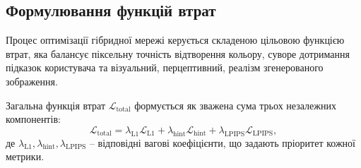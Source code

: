         \subsection{Формулювання функцій втрат}
            Процес оптимізації гібридної мережі керується складеною цільовою функцією втрат,
            яка балансує піксельну точність відтворення кольору,
            суворе дотримання підказок користувача та візуальний, перцептивний, реалізм згенерованого зображення. 
            
            Загальна функція втрат $\mathcal{L}_{\mathrm{total}}$ формується як зважена сума трьох незалежних компонентів:
            \begin{equation*}
                \mathcal{L}_{\mathrm{total}} = \lambda_{\mathrm{L1}} \mathcal{L}_{\mathrm{L1}} + \lambda_{\mathrm{hint}} \mathcal{L}_{\mathrm{hint}} + \lambda_{\mathrm{LPIPS}} \mathcal{L}_{\mathrm{LPIPS}},
            \end{equation*}
            де $\lambda_{\mathrm{L1}}, \lambda_{\mathrm{hint}}, \lambda_{\mathrm{LPIPS}}$ -- відповідні вагові коефіцієнти, що задають пріоритет кожної метрики.

